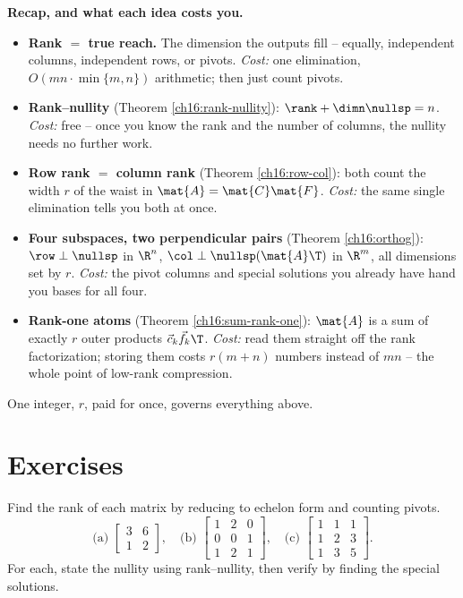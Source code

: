 \begin{recoverybox}
\textbf{Recap, and what each idea costs you.}
\begin{itemize}
  \item \textbf{Rank $=$ true reach.} The dimension the outputs fill -- equally,
        independent columns, independent rows, or pivots. \emph{Cost:} one
        elimination, $O(mn\cdot\min\{m,n\})$ arithmetic; then just count pivots.
  \item \textbf{Rank--nullity} (Theorem \ref{ch16:rank-nullity}):
        $\rank + \dimn\nullsp = n$. \emph{Cost:} free -- once you know the rank and
        the number of columns, the nullity needs no further work.
  \item \textbf{Row rank $=$ column rank} (Theorem \ref{ch16:row-col}): both count
        the width $r$ of the waist in $\mat{A}=\mat{C}\mat{F}$. \emph{Cost:} the
        same single elimination tells you both at once.
  \item \textbf{Four subspaces, two perpendicular pairs} (Theorem
        \ref{ch16:orthog}): $\row\perp\nullsp$ in $\R^n$,
        $\col\perp\nullsp(\mat{A}\T)$ in $\R^m$, all dimensions set by $r$.
        \emph{Cost:} the pivot columns and special solutions you already have hand
        you bases for all four.
  \item \textbf{Rank-one atoms} (Theorem \ref{ch16:sum-rank-one}): $\mat{A}$ is a
        sum of exactly $r$ outer products $\vec{c}_k\vec{f}_k\T$. \emph{Cost:} read
        them straight off the rank factorization; storing them costs $r(m+n)$
        numbers instead of $mn$ -- the whole point of low-rank compression.
\end{itemize}
One integer, $r$, paid for once, governs everything above.
\end{recoverybox}

\section{Exercises}

\begin{exercise}\label{ch16:ex-warmup}
Find the rank of each matrix by reducing to echelon form and counting pivots.
\[
  \text{(a) } \begin{bmatrix} 3 & 6 \\ 1 & 2 \end{bmatrix}, \quad
  \text{(b) } \begin{bmatrix} 1 & 2 & 0 \\ 0 & 0 & 1 \\ 1 & 2 & 1 \end{bmatrix}, \quad
  \text{(c) } \begin{bmatrix} 1 & 1 & 1 \\ 1 & 2 & 3 \\ 1 & 3 & 5 \end{bmatrix}.
\]
For each, state the nullity using rank--nullity, then verify by finding the
special solutions.
\end{exercise}

